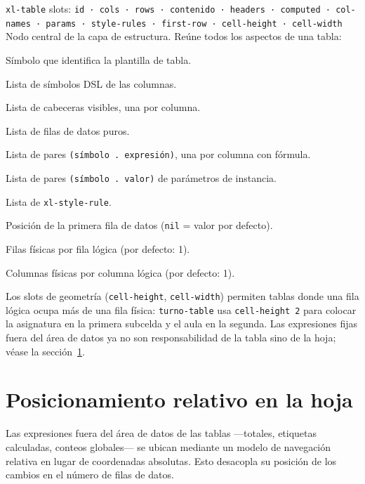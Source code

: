 \documentclass[12pt,a4paper]{report}
\begin{document}
\begin{nodobox}{\texttt{xl-table} \quad \small\textmd{slots:} \texttt{id · cols · rows · contenido · headers · computed · col-names · params · style-rules · first-row · cell-height · cell-width}}
Nodo central de la capa de estructura. Reúne todos los aspectos de una tabla:

\begin{description}[leftmargin=2em,labelwidth=3.5cm,labelsep=0.5em]
  \item[\texttt{id}] Símbolo que identifica la plantilla de tabla.
  \item[\texttt{col-names}] Lista de símbolos DSL de las columnas.
  \item[\texttt{headers}] Lista de cabeceras visibles, una por columna.
  \item[\texttt{contenido}] Lista de filas de datos puros.
  \item[\texttt{computed}] Lista de pares \texttt{(símbolo . expresión)}, una por columna con fórmula.
  \item[\texttt{params}] Lista de pares \texttt{(símbolo . valor)} de parámetros de instancia.
  \item[\texttt{style-rules}] Lista de \texttt{xl-style-rule}.
  \item[\texttt{first-row}] Posición de la primera fila de datos (\texttt{nil} = valor por defecto).
  \item[\texttt{cell-height}] Filas físicas por fila lógica (por defecto: 1).
  \item[\texttt{cell-width}] Columnas físicas por columna lógica (por defecto: 1).
\end{description}

Los slots de geometría (\texttt{cell-height}, \texttt{cell-width}) permiten tablas donde una fila lógica ocupa más de una fila física: \texttt{turno-table} usa \texttt{cell-height 2} para colocar la asignatura en la primera subcelda y el aula en la segunda. Las expresiones fijas fuera del área de datos ya no son responsabilidad de la tabla sino de la hoja; véase la sección~\ref{sec:posrel}.
\end{nodobox}

\section{Posicionamiento relativo en la hoja}
\label{sec:posrel}

Las expresiones fuera del área de datos de las tablas ---totales, etiquetas calculadas, conteos globales--- se ubican mediante un modelo de navegación relativa en lugar de coordenadas absolutas. Esto desacopla su posición de los cambios en el número de filas de datos.
\end{document}
